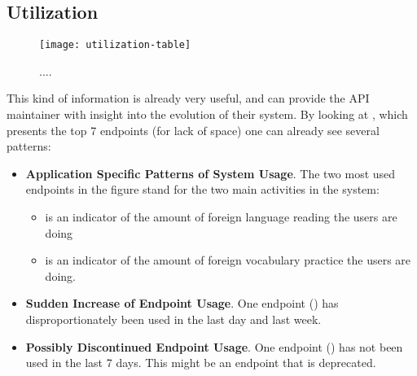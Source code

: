 
\subsection{Utilization}
\label{sec:util}




  \begin{figure}[h!]
  \centering
  \texttt{[image: utilization-table]}
  \caption{....}
  \label{fig:basicest}
  \end{figure}

This kind of information is already very useful, and can provide the API maintainer with insight into the evolution of their system. By looking at , which presents the top 7 endpoints (for lack of space) one can already see several patterns: 

\begin{itemize}

  \item {\bf Application Specific Patterns of System Usage}. The two most used endpoints in the figure stand for the two main activities in the system: 

  \begin{itemize}

    \item \epTranslationsColor is an indicator of the amount of foreign language reading the users are doing

    \item \epOutcomeColor is an indicator of the amount of foreign vocabulary practice the users are doing.

  \end{itemize}

  \item {\bf Sudden Increase of Endpoint Usage}. One endpoint (\epUserActivityColor) has disproportionately been used in the last day and last week. 

  \item {\bf Possibly Discontinued Endpoint Usage}. One endpoint (\epFeedItemsColor) has not been used in the last 7 days. This might be an endpoint that is deprecated.

\end{itemize}

